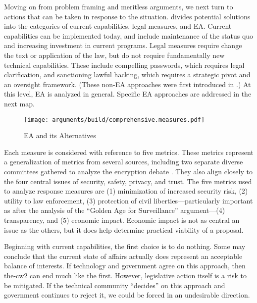 Moving on from problem framing and meritless arguments, we next turn to actions that can be taken in response to the
situation.  divides potential solutions into the categories of current capabilities, legal
measures, and \ac{EA}. Current capabilities can be implemented today, and include maintenance of the status quo and
increasing investment in current programs. Legal measures require change the text or application of the law, but do not
require fundamentally new technical capabilities. These include compelling passwords, which requires legal
clarification, and sanctioning lawful hacking, which requires a strategic pivot and an oversight framework. (These
non-\ac{EA} approaches were first introduced in .) At this level, \ac{EA} is analyzed in
general. Specific EA approaches are addressed in the next map.

\begin{sidewaysfigure}
  \centering\CaptionFontSize
  \texttt{[image: arguments/build/comprehensive.measures.pdf]}
  \caption{EA and its Alternatives}
  \label{fig-arg-measures}
\end{sidewaysfigure}

Each measure is considered with reference to five metrics. These metrics represent a generalization of metrics from
several sources, including two separate diverse committees gathered to analyze the encryption debate
\cite{committee_decrypting_2018} \cite{group_2019} \cite{varia_2018}. They also align closely to the four central issues
of security, safety, privacy, and trust. The five metrics used to analyze response measures are (1) minimization of
increased security risk, (2) utility to law enforcement, (3) protection of civil liberties---particularly important as
after the analysis of the ``Golden Age for Surveillance'' argument---(4) transparency, and (5) economic impact. Economic
impact is not as central an issue as the others, but it does help determine practical viability of a proposal.

Beginning with current capabilities, the first choice is to do nothing. Some may conclude that the current state of
affairs actually does represent an acceptable balance of interests. If technology and government agree on this approach,
then \ac{the-cw2} can end much like the first. However, legislative action itself is a risk to be mitigated. If the
technical community ``decides'' on this approach and government continues to reject it, we could be forced in an
undesirable direction.


